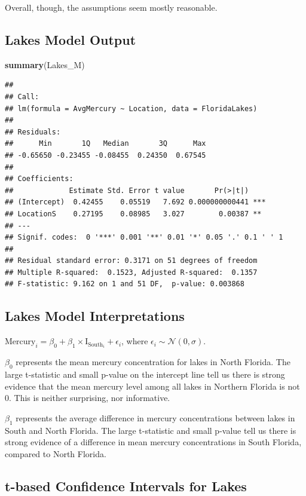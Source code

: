 \documentclass[]{book}
\newenvironment{Shaded}{\begin{snugshade}}{\end{snugshade}}
\newcommand{\KeywordTok}[1]{\textcolor[rgb]{0.13,0.29,0.53}{\textbf{#1}}}
\newcommand{\NormalTok}[1]{#1}
\begin{document}
Overall, though, the assumptions seem mostly reasonable.

\subsection{Lakes Model Output}\label{lakes-model-output}

\begin{Shaded}
\begin{Highlighting}[]
\KeywordTok{summary}\NormalTok{(Lakes_M)}
\end{Highlighting}
\end{Shaded}

\begin{verbatim}
## 
## Call:
## lm(formula = AvgMercury ~ Location, data = FloridaLakes)
## 
## Residuals:
##      Min       1Q   Median       3Q      Max 
## -0.65650 -0.23455 -0.08455  0.24350  0.67545 
## 
## Coefficients:
##             Estimate Std. Error t value       Pr(>|t|)    
## (Intercept)  0.42455    0.05519   7.692 0.000000000441 ***
## LocationS    0.27195    0.08985   3.027        0.00387 ** 
## ---
## Signif. codes:  0 '***' 0.001 '**' 0.01 '*' 0.05 '.' 0.1 ' ' 1
## 
## Residual standard error: 0.3171 on 51 degrees of freedom
## Multiple R-squared:  0.1523, Adjusted R-squared:  0.1357 
## F-statistic: 9.162 on 1 and 51 DF,  p-value: 0.003868
\end{verbatim}

\subsection{Lakes Model
Interpretations}\label{lakes-model-interpretations}

\(\text{Mercury}_i = \beta_0 + \beta_1\times\text{I}_{\text{South}_i} + \epsilon_i\),
where \(\epsilon_i\sim\mathcal{N}(0, \sigma)\).

\(\beta_0\) represents the mean mercury concentration for lakes in North
Florida. The large t-statistic and small p-value on the intercept line
tell us there is strong evidence that the mean mercury level among all
lakes in Northern Florida is not 0. This is neither surprising, nor
informative.

\(\beta_1\) represents the average difference in mercury concentrations
between lakes in South and North Florida. The large t-statistic and
small p-value tell us there is strong evidence of a difference in mean
mercury concentrations in South Florida, compared to North Florida.

\subsection{t-based Confidence Intervals for
Lakes}\label{t-based-confidence-intervals-for-lakes}
\end{document}
